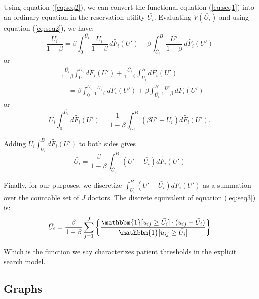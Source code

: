 \documentclass[../main.tex]{subfiles}
\begin{document}
Using equation (\ref{eq:seq2}), we can convert the functional equation (\ref{eq:seq1}) into an ordinary equation in the reservation utility $\bar{U_i}$. Evaluating $V(\bar{U_i})$ and using equation (\ref{eq:seq2}), we have:
$$
\frac{\bar{U_i}}{1-\beta}= \beta \int_0^{\bar{U_i}} \frac{\bar{U_i}}{1-\beta} \, d \tilde{F_i}(U') + \beta \int_{\bar{U_i}}^B \frac{U'}{1-\beta} \, d \tilde{F_i}(U')
$$
or
$$
\begin{aligned}
& \frac{\bar{U_i}}{1-\beta} \int_0^{\bar{U_i}} d \tilde{F_i}(U') + \frac{\bar{U_i}}{1-\beta} \int_{\bar{U_i}}^B d \tilde{F_i}(U') \\
& \quad = \beta \int_0^{\bar{U_i}} \frac{\bar{U_i}}{1-\beta} \, d \tilde{F_i}(U') + \beta \int_{\bar{U_i}}^B \frac{U'}{1-\beta} \, d \tilde{F_i}(U')
\end{aligned}
$$
or
$$
\bar{U_i} \int_0^{\bar{U_i}} d \tilde{F_i}(U') = \frac{1}{1-\beta} \int_{\bar{U_i}}^B \left(\beta U' - \bar{U_i}\right) d \tilde{F_i}(U') .
$$

Adding $\bar{U_i} \int_{\bar{U_i}}^B d \tilde{F_i}(U')$ to both sides gives
\begin{equation}
    \bar{U_i} = \frac{\beta}{1-\beta} \int_{\bar{U_i}}^B \left(U' - \bar{U_i}\right) d \tilde{F_i}(U')
    \label{eq:seq3}  
\end{equation}


Finally, for our purposes, we discretize $\int_{\bar{U_i}}^B \left(U' - \bar{U_i}\right) d \tilde{F_i}(U')$ as a summation over the countable set of $J$ doctors. The discrete equivalent of equation (\ref{eq:seq3}) is:
\begin{equation}
    \bar{U_i} = \frac{\beta}{1-\beta}  \sum_{j=1}^{J} \left\{ \frac{\mathbbm{1}[ u_{ij} \geq \bar{U_i} ] \cdot (u_{ij} - \bar{U_i})}{\mathbbm{1}[ u_{ij} \geq \bar{U_i} ]} \right\}
    \label{eq:seq4}  
\end{equation}

Which is the function we say characterizes patient thresholds in the explicit search model.

\newpage

\subsection{Graphs}
\end{document}
